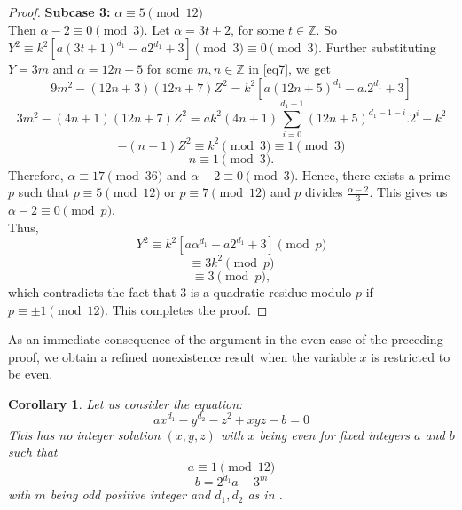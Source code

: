\documentclass[12pt, reqno]{amsart}
\newtheorem{corollary}[thm]{Corollary}
\numberwithin{equation}{section}
\theoremstyle{definition}
\theoremstyle{nodefstyle}
\begin{document}
\begin{proof}
    \textbf{Subcase 3:} $\alpha \equiv 5 \pmod{12}$\\
    \vspace{2mm}
    Then $\alpha -2 \equiv 0 \pmod{3}$. Let $\alpha = 3t+2$, for some $t \in \mathbb{Z}$. So $Y^2 \equiv k^2\left[a(3t+1)^{d_1}-a2^{d_1}+3\right] \pmod{3} \equiv 0 \pmod{3}.$
    Further substituting $Y=3m$ and $\alpha =12n+5$ for some $m,n \in \mathbb{Z}$ in \eqref{eq7}, we get
    \[9m^2-(12n+3)(12n+7)Z^2=k^2\left [a(12n+5)^{d_1}-a.2^{d_1}+3\right]\]
    \[ 3m^2-(4n+1)(12n+7)Z^2=ak^2(4n+1)\sum _{i=0}^{d_1-1}(12n+5)^{d_1-1-i}.2^i+k^2\]
    \[ -(n+1)Z^2 \equiv k^2 \pmod{3} \equiv 1 \pmod{3}\]
    \[ n \equiv 1 \pmod{3}.\]
    Therefore, $\alpha \equiv 17 \pmod{36}$ and $\alpha -2 \equiv 0 \pmod{3}.$ Hence, there exists a prime $p$ such that $p \equiv 5 \pmod{12}$ or $p \equiv 7 \pmod{12}$ and $p$ divides  $\frac{\alpha -2}{3}$. This gives us $\alpha -2 \equiv 0 \pmod{p}.$\\
    Thus, \[Y^2 \equiv k^2\left[a\alpha ^{d_1}-a2^{d_1}+3\right] \pmod{p}\] \hfill \[\equiv 3k^2 \pmod{p}\] \hfill \[ \equiv 3 \pmod{p},\]
    which contradicts the fact that $3$ is a quadratic residue modulo $p$ if $p \equiv \pm 1 \pmod{12}$. This completes the proof.
\end{proof}
As an immediate consequence of the argument in the even case of the preceding proof,
we obtain a refined nonexistence result when the variable $x$ is restricted to be even.
\begin{corollary}\label{cor:1}
    Let us consider the equation:
    \[ax^{d_1}-y^{d_2}-z^2+xyz-b=0\]
    This has no integer solution $(x,y,z)$ with $x$ being even for fixed integers $a$ and $b$ such that
    \[a\equiv 1 \pmod {12}\]
\[b=2^{d_1}a-3^m\] with $m$ being odd positive integer and $d_1, d_2$ as in . 
\end{corollary}
\end{document}
